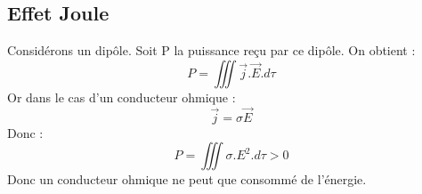 \subsection{Effet Joule}
Considérons un dipôle. Soit P la puissance reçu par ce dipôle. On obtient : 
$$P = \iiint \overrightarrow{j}.\overrightarrow{E}.d\tau$$
Or dans le cas d'un conducteur ohmique : 
$$\overrightarrow{j} = \sigma \overrightarrow{E}$$
Donc : 
$$P = \iiint \sigma.E^2.d\tau > 0$$
Donc un conducteur ohmique ne peut que consommé de l'énergie.
